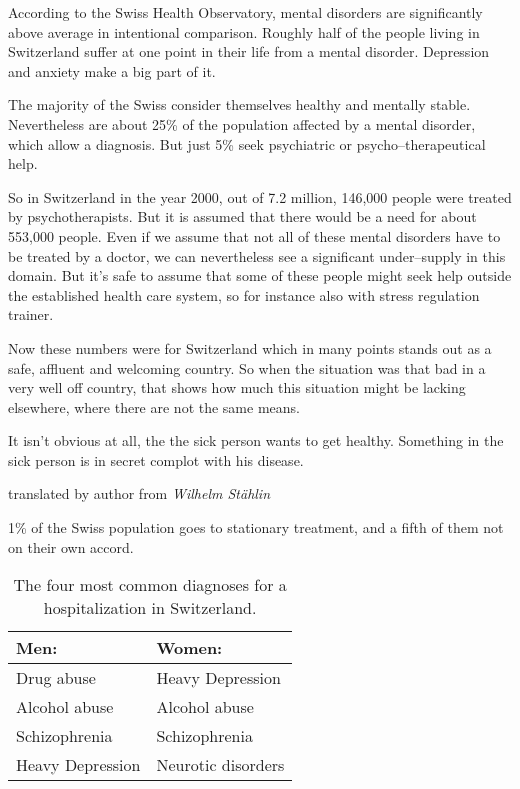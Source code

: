\documentclass[../main.tex]{subfiles}
\begin{document}
According to the Swiss Health Observatory, mental disorders are significantly above average in intentional comparison. Roughly half of the people living in Switzerland suffer at one point in their life from a mental disorder. Depression and anxiety make a big part of it.

The majority of the Swiss consider themselves healthy and mentally stable. Nevertheless are about 25\% of the population affected by a mental disorder, which allow a diagnosis.
But just 5\% seek psychiatric or psycho--therapeutical help. 

So in Switzerland in the year 2000, out of 7.2 million, 146,000 people were treated by psychotherapists. But it is assumed that there would be a need for about 553,000 people. Even if we assume that not all of these mental disorders have to be treated by a doctor, we can nevertheless see a significant under--supply in this domain. But it's safe to assume that some of these people might seek help outside the established health care system, so for instance also with stress regulation trainer.

Now these numbers were for Switzerland which in many points stands out as a safe, affluent and welcoming country. So when the situation was that bad in a very well off country, that shows how much this situation might be lacking elsewhere, where there are not the same means.

\epigraph{It isn't obvious at all, the the sick person wants to get healthy. Something in the sick person is in secret complot with his disease.}{translated by author from \textit{Wilhelm St\"ahlin}}


1\% of the Swiss population goes to stationary treatment, and a fifth of them not on their own accord.

\begin{table}[htb]
	\centering
\begin{tabular}{ll}
	Men: & Women: \\
	\hline
	Drug abuse & Heavy Depression \\
	Alcohol abuse & Alcohol abuse \\
	Schizophrenia & Schizophrenia \\
	Heavy Depression & Neurotic disorders \\
\end{tabular}
\caption{The four most common diagnoses for a hospitalization in Switzerland.}
\end{table}
\end{document}
